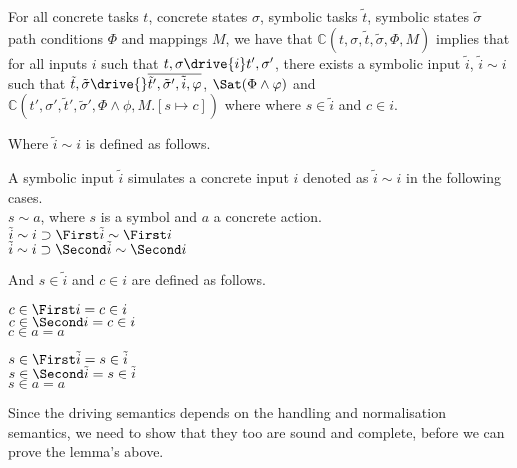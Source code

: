 \begin{lemma}
  \label{lem:completedriving}
  For all concrete tasks $t$, concrete states $\sigma$, symbolic tasks $\tilde{t}$, symbolic states $\tilde{\sigma}$ path conditions $\Phi$ and mappings $M$,
  we have that $\mathds{C}(t,\sigma,\tilde{t},\tilde{\sigma},\Phi,M)$ implies
  that for all inputs $i$ such that $t,\sigma\drive{i}t',\sigma'$,
  there exists a symbolic input $\tilde{i}$, $\tilde{i}\sim i$ such that
  $\tilde{t},\tilde{\sigma}\drive{}\overline{\tilde{t}',\tilde{\sigma}',\tilde{i},\phi}$, $\Sat(\Phi\land\phi)$ and $\mathds{C}(t',\sigma',\tilde{t}',\tilde{\sigma}',\Phi\land\phi,M.[s\mapsto c])$ where where $s\in\tilde{i}$ and $c\in i$.
\end{lemma}

Where $\tilde{i}\sim i$ is defined as follows.

\begin{definition}
  A symbolic input $\tilde{i}$ simulates a concrete input $i$ denoted as $\tilde{i}\sim i$ in the following cases.\\
  $s\sim a$, where $s$ is a symbol and $a$ a concrete action.\\
  $\tilde{i}\sim i\implies \First \tilde{i} \sim \First i$\\
  $\tilde{i}\sim i\implies \Second \tilde{i} \sim \Second i$
\end{definition}

And $s\in \tilde{i}$ and $c\in i$ are defined as follows.

\begin{definition}
  $c\in \First i = c\in i $\\
  $c\in \Second i = c\in i $\\
  $c\in a = a $
\end{definition}

\begin{definition}
  $s\in \First \tilde{i} = s\in \tilde{i} $\\
  $s\in \Second \tilde{i} = s\in \tilde{i} $\\
  $s\in a = a $
\end{definition}

Since the driving semantics depends on the handling and normalisation semantics, we need to show that they too are sound and complete, before we can prove the lemma's above.



